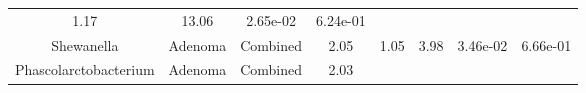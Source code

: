 \documentclass[12pt,]{article}
\begin{document}
\begin{longtable}[]{@{}cccccccc@{}}
\begin{minipage}[t]{0.14\columnwidth}
1.17\strut
\end{minipage} & \begin{minipage}[t]{0.14\columnwidth}\centering\strut
13.06\strut
\end{minipage} & \begin{minipage}[t]{0.06\columnwidth}\centering\strut
2.65e-02\strut
\end{minipage} & \begin{minipage}[t]{0.06\columnwidth}\centering\strut
6.24e-01\strut
\end{minipage}\tabularnewline
\begin{minipage}[t]{0.18\columnwidth}\centering\strut
Shewanella\strut
\end{minipage} & \begin{minipage}[t]{0.07\columnwidth}\centering\strut
Adenoma\strut
\end{minipage} & \begin{minipage}[t]{0.09\columnwidth}\centering\strut
Combined\strut
\end{minipage} & \begin{minipage}[t]{0.03\columnwidth}\centering\strut
2.05\strut
\end{minipage} & \begin{minipage}[t]{0.14\columnwidth}\centering\strut
1.05\strut
\end{minipage} & \begin{minipage}[t]{0.14\columnwidth}\centering\strut
3.98\strut
\end{minipage} & \begin{minipage}[t]{0.06\columnwidth}\centering\strut
3.46e-02\strut
\end{minipage} & \begin{minipage}[t]{0.06\columnwidth}\centering\strut
6.66e-01\strut
\end{minipage}\tabularnewline
\begin{minipage}[t]{0.18\columnwidth}\centering\strut
Phascolarctobacterium\strut
\end{minipage} & \begin{minipage}[t]{0.07\columnwidth}\centering\strut
Adenoma\strut
\end{minipage} & \begin{minipage}[t]{0.09\columnwidth}\centering\strut
Combined\strut
\end{minipage} & \begin{minipage}[t]{0.03\columnwidth}\centering\strut
2.03\strut
\end{minipage} & \begin{minipage}[t]{0.14\columnwidth}\centering\strut

\end{minipage}
\end{longtable}
\end{document}

